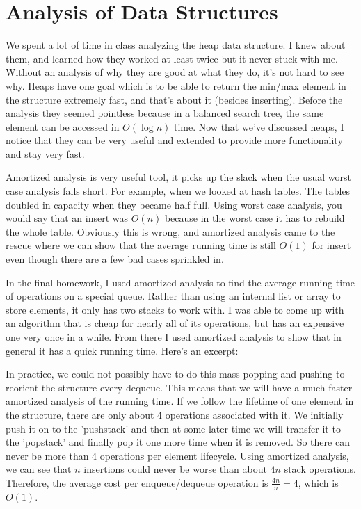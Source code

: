 \documentclass[a4paper,12pt]{article}
\newenvironment{indentpar}[1]%
{\begin{list}{}%
    {\setlength{\leftmargin}{#1}}%
  \item[]%
  }
  {\end{list}}
\begin{document}
\section*{Analysis of Data Structures}

\begin{enumerate}[]

\item We spent a lot of time in class analyzing the heap
  data structure. I knew about them, and learned how they worked at
  least twice but it never stuck with me. Without an analysis of why
  they are good at what they do, it's not hard to see why. Heaps have
  one goal which is to be able to return the min/max element in the
  structure extremely fast, and that's about it (besides
  inserting). Before the analysis they seemed pointless because in a
  balanced search tree, the same element can be accessed in $O(\log
  n)$ time. Now that we've discussed heaps, I notice that they can be
  very useful and extended to provide more functionality and stay very
  fast.

\item Amortized analysis is very useful tool, it picks up the slack
  when the usual worst case analysis falls short. For example, when we
  looked at hash tables. The tables doubled in capacity when they
  became half full. Using worst case analysis, you would say that an
  insert was $O(n)$ because in the worst case it has to rebuild the
  whole table. Obviously this is wrong, and amortized analysis came to
  the rescue where we can show that the average running time is still
  $O(1)$ for insert even though there are a few bad cases sprinkled
  in.

\item In the final homework, I used amortized analysis to find the
  average running time of operations on a special queue. Rather than
  using an internal list or array to store elements, it only has two
  stacks to work with. I was able to come up with an algorithm that is
  cheap for nearly all of its operations, but has an expensive one
  very once in a while. From there I used amortized analysis to show
  that in general it has a quick running time. Here's an excerpt:

  \begin{indentpar}{0.5in}
    In practice, we could not possibly have to do this mass popping
    and pushing to reorient the structure every dequeue. This means
    that we will have a much faster amortized analysis of the running
    time. If we follow the lifetime of one element in the structure,
    there are only about 4 operations associated with it. We initially
    push it on to the 'pushstack' and then at some later time we will
    transfer it to the 'popstack' and finally pop it one more time
    when it is removed. So there can never be more than 4 operations
    per element lifecycle. Using amortized analysis, we can see that
    $n$ insertions could never be worse than about $4n$ stack
    operations. Therefore, the average cost per enqueue/dequeue
    operation is $\frac{4n}{n} = 4$, which is $O(1)$.  
  \end{indentpar}
  
\end{enumerate}
\end{document}
